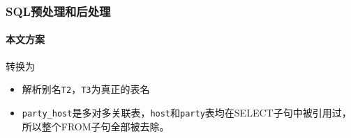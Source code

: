 \documentclass{ctexbeamer}
\begin{document}
\begin{frame}
  \frametitle{SQL预处理和后处理}
  \framesubtitle{本文方案}
  \begin{example}
    

    转换为

    
  \end{example}
  \begin{itemize}
    \item 解析别名\texttt{T2}，\texttt{T3}为真正的表名
    \item \texttt{party\_host}是多对多关联表，\texttt{host}和\texttt{party}表均在SELECT子句中被引用过，所以整个FROM子句全部被去除。
  \end{itemize}
\end{frame}
\end{document}
